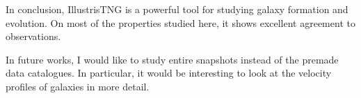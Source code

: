 In conclusion, IllustrisTNG is a powerful tool for studying galaxy formation and evolution. On most of the properties studied here, it shows excellent agreement to observations.

In future works, I would like to study entire snapshots instead of the premade data catalogues. In particular, it would be interesting to look at the velocity profiles of galaxies in more detail.